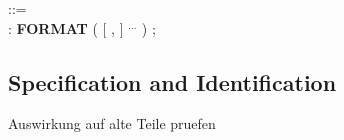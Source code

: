 



















 ::= \\
\x {} : {\bf FORMAT} (  [ ,  ] $^{...}$ ) ;\\






        













        



\subsection{Specification and Identification}    %
\begin{discuss}
Auswirkung auf alte Teile pruefen



\end{discuss}


